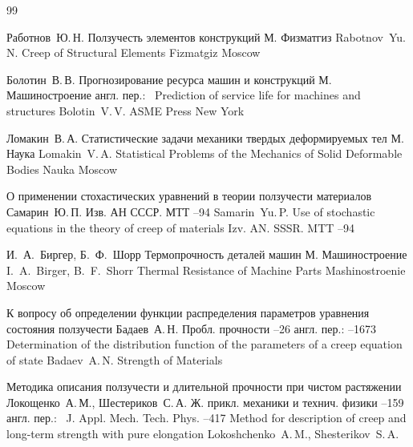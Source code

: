 \begin{thebibliography}{99}

\by Работнов~Ю.\,Н.
\book Ползучесть элементов конструкций
\publaddr М.
\publ Физматгиз
\misctransl 
\by Rabotnov~Yu.\,N.
\book Creep of Structural Elements 
\publ Fizmatgiz
\publaddr Moscow 

\by Болотин~В.\,В.
\book Прогнозирование ресурса машин и конструкций
\publaddr М.
\publ Машиностроение
\transl англ. пер.:~
\book Prediction of service life for machines and structures
\by Bolotin~V.\,V.
\publ ASME Press
\publaddr New York


\by Ломакин~В.\,А.
\book Статистические задачи механики твердых деформируемых тел
\publaddr М.
\publ Наука
\misctransl
\by Lomakin~V.\,A.
\book Statistical Problems of the Mechanics of Solid Deformable Bodies 
\publ Nauka
\publaddr Moscow 

\paper О применении стохастических уравнений в теории ползучести материалов
\by Самарин~Ю.\,П.
\jour Изв. АН СССР. МТТ
--94
\misctransl
\by Samarin~Yu.\,P.
\paper Use of stochastic equations in the theory of creep of materials
\jour Izv. AN. SSSR. MTT
--94



\eds И.~А.~Биргер, Б.~Ф.~Шорр
\book Термопрочность деталей машин
\publaddr М.
\publ Машиностроение
\misctransl
\eds I.~A.~Birger, B.~F.~Shorr 
\book Thermal Resistance of Machine Parts 
\publ Mashinostroenie
\publaddr Moscow 

\paper К вопросу об определении функции распределения параметров уравнения состояния ползучести
\by Бадаев~А.\,Н.
\jour Пробл. прочности
--26
\transl англ. пер.: {}
--1673
\paper  Determination of the distribution function of the parameters of a creep equation of state
\by Badaev~A.\,N.
\jour Strength of Materials

\paper Методика описания ползучести и длительной прочности при чистом растяжении
\by Локощенко~А.\,М., Шестериков~С.\,А.
\jour Ж. прикл. механики и технич. физики
--159
\transl англ. пер.:~
\jour J. Appl. Mech. Tech. Phys. 
--417
\paper Method for description of creep and long-term strength with pure elongation
\by Lokoshchenko~A.\,M.,  Shesterikov~S.\,A.



\end{thebibliography}

